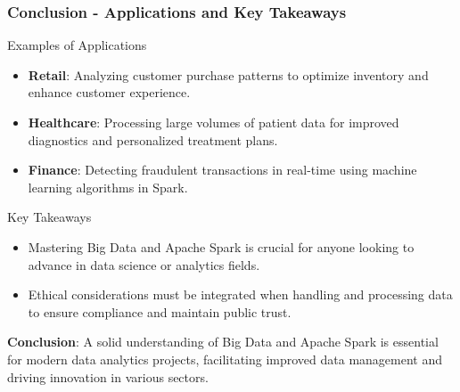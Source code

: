 \documentclass[aspectratio=169]{beamer}
\begin{document}
\begin{frame}[fragile]
    \frametitle{Conclusion - Applications and Key Takeaways}
    
    \begin{block}{Examples of Applications}
        \begin{itemize}
            \item \textbf{Retail}: Analyzing customer purchase patterns to optimize inventory and enhance customer experience.
            \item \textbf{Healthcare}: Processing large volumes of patient data for improved diagnostics and personalized treatment plans.
            \item \textbf{Finance}: Detecting fraudulent transactions in real-time using machine learning algorithms in Spark.
        \end{itemize}
    \end{block}
    
    \vspace{0.5cm}
    
    \begin{block}{Key Takeaways}
        \begin{itemize}
            \item Mastering Big Data and Apache Spark is crucial for anyone looking to advance in data science or analytics fields.
            \item Ethical considerations must be integrated when handling and processing data to ensure compliance and maintain public trust.
        \end{itemize}
    \end{block}
    
    \vspace{0.5cm}
    
    \textbf{Conclusion}: A solid understanding of Big Data and Apache Spark is essential for modern data analytics projects, facilitating improved data management and driving innovation in various sectors.
\end{frame}
\end{document}

